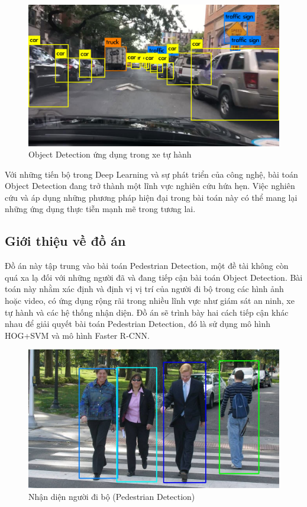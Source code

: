 \graphicspath{{figures/}}
\begin{figure}[h!]
  \centering
  \includegraphics[scale=0.3]{graphics/Object Detection in Autonomous Driving.jpg}
  \caption{Object Detection ứng dụng trong xe tự hành}
\end{figure}

Với những tiến bộ trong Deep Learning và sự phát triển của công nghệ, bài toán Object Detection đang trở thành một lĩnh vực nghiên cứu hứa hẹn. Việc nghiên cứu và áp dụng những phương pháp hiện đại trong bài toán này có thể mang lại những ứng dụng thực tiễn mạnh mẽ trong tương lai.

\subsection{Giới thiệu về đồ án}
Đồ án này tập trung vào bài toán Pedestrian Detection, một đề tài không còn quá xa lạ đối với những người đã và đang tiếp cận bài toán Object Detection. Bài toán này nhằm xác định và định vị vị trí của người đi bộ trong các hình ảnh hoặc video, có ứng dụng rộng rãi trong nhiều lĩnh vực như giám sát an ninh, xe tự hành và các hệ thống nhận diện. Đồ án sẽ trình bày hai cách tiếp cận khác nhau để giải quyết bài toán Pedestrian Detection, đó là sử dụng mô hình HOG+SVM và mô hình Faster R-CNN.

\graphicspath{{figures/}}
\begin{figure}[h!]
  \centering
  \includegraphics[scale=0.39]{graphics/Hinh2.jpg}
  \caption{Nhận diện người đi bộ (Pedestrian Detection)}
\end{figure}

